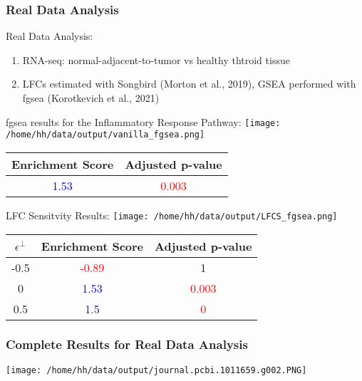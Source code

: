 \documentclass[11pt]{beamer}
\begin{document}
\begin{frame}
  \frametitle{Real Data Analysis}

  Real Data Analysis:
  \begin{enumerate}
    \item RNA-seq: normal-adjacent-to-tumor vs healthy thtroid tissue
    \item LFCs estimated with Songbird (Morton et al., 2019), GSEA performed with fgsea (Korotkevich et al., 2021)
  \end{enumerate}

  \pause

  fgsea results for the Inflammatory Response Pathway:
  \texttt{[image: /home/hh/data/output/vanilla\_fgsea.png]}
    \begin{center}
    \begin{tabular}{ |c|c| }
    \hline
    Enrichment Score & Adjusted p-value \\
    \hline
    \textcolor{blue}{1.53} & \textcolor{red}{0.003}  \\
    \hline
    \end{tabular}
    \end{center}
 
  \pause
  LFC Sensitvity Results:
  \texttt{[image: /home/hh/data/output/LFCS\_fgsea.png]}
    \begin{center}
    \begin{tabular}{ |c|c|c| }
    \hline
    \(\epsilon^\perp\) & Enrichment Score & Adjusted p-value \\
    \hline
    -0.5 & \textcolor{red}{-0.89} & 1  \\
    \hline
    0 & \textcolor{blue}{1.53} & \textcolor{red}{0.003}  \\
    \hline
    0.5 & \textcolor{blue}{1.5} & \textcolor{red}{0}  \\
    \hline
    \end{tabular}
    \end{center}

\end{frame}

\begin{frame}
  \frametitle{Complete Results for Real Data Analysis}
  
  \texttt{[image: /home/hh/data/output/journal.pcbi.1011659.g002.PNG]}
\end{frame}
\end{document}
